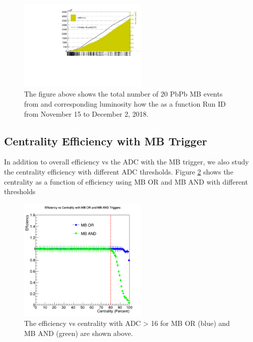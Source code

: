 \begin{figure}[hbtp]
\begin{center}
\includegraphics[width=0.55\textwidth]{Figures/Chapter3/MBStat.pdf}
\caption{The figure above shows the total number of 20 PbPb MB events from and corresponding luminosity how the as a function Run ID from November 15 to December 2, 2018.}
\label{MBStat}
\end{center}
\end{figure} 


\subsection{Centrality Efficiency with MB Trigger}

In addition to overall efficiency vs the ADC with the MB trigger, we also study the centrality efficiency with different ADC thresholds. Figure \ref{EffCent} shows the centrality as a function of efficiency using MB OR and MB AND with different thresholds

\begin{figure}[hbtp]
\begin{center}
\includegraphics[width=0.55\textwidth]{Figures/Chapter3/EffCent.png}
\caption{The efficiency vs centrality with ADC > 16 for MB OR (blue) and MB AND (green) are shown above.}
\label{EffCent}
\end{center}
\end{figure} 

